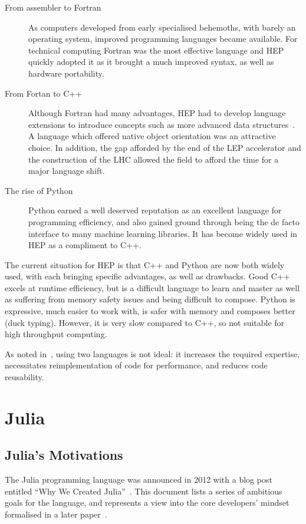 \documentclass{webofc}
\begin{document}
\begin{description}
    \item[From assembler to Fortran] As computers developed from early
    specialised behemoths, with barely an operating system, improved programming
    languages became available. For technical computing Fortran was the most
    effective language and HEP quickly adopted it as it brought a much improved
    syntax, as well as hardware portability.
    \item[From Fortan to C++] Although Fortran had many advantages, HEP had to
    develop language extensions to introduce concepts such as more advanced data
    structures~\cite{Zoll:2296399}. A language which offered native object
    orientation was an attractive choice. In addition, the gap afforded by the
    end of the LEP accelerator and the construction of the LHC allowed the field
    to afford the time for a major language shift.
    \item[The rise of Python] Python earned a well deserved reputation as an
    excellent language for programming efficiency, and also gained ground
    through being the de facto interface to many machine learning libraries. It
    has become widely used in HEP as a compliment to C++.
\end{description}

The current situation for HEP is that C++ and Python are now both widely used,
with each bringing specific advantages, as well as drawbacks. Good C++ excels at
runtime efficiency, but is a difficult language to learn and master as well as
suffering from memory safety issues and being difficult to compose. Python is
expressive, much easier to work with, is safer with memory and composes better
(duck typing). However, it is very slow compared to C++, so not suitable for
high throughput computing.

As noted in~\cite{eschle2023potential}, using two languages is not ideal: it
increases the required expertise, necessitates reimplementation of code for
performance, and reduces code reusability.

\section{Julia}

\subsection{Julia's Motivations}

The Julia programming language was announced in 2012 with a blog post entitled
``Why We Created Julia''~\cite{why-create-julia}. This document lists a series of
ambitious goals for the language, and represents a view into the core
developers' mindset formalised in a later
paper~\cite{bib:julia_freshapproach,10.1145/3276490}.
\end{document}
